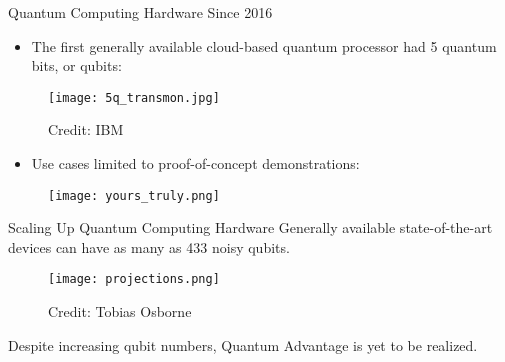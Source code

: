 \begin{frame}{Quantum Computing Hardware Since 2016}
  \begin{itemize}
    \setlength\itemsep{0.1em}
    \item The first generally available cloud-based quantum processor had {\color{red}5 quantum bits, or qubits}:
  \end{itemize}

  \begin{figure}
    \centering
    \texttt{[image: 5q\_transmon.jpg]}
    \vspace*{-3mm}
    \caption*{Credit: IBM}
  \end{figure}

  \begin{itemize}
    \setlength\itemsep{0.1em}
     \item Use cases limited to proof-of-concept demonstrations:
  \end{itemize}

  \begin{figure}
    \centering
    \texttt{[image: yours\_truly.png]}
  \end{figure}
\end{frame}

\begin{frame}{Scaling Up Quantum Computing Hardware}
  Generally available state-of-the-art devices can have as many as {\color{red}433} noisy qubits.

  \begin{figure}
    \centering
    \texttt{[image: projections.png]}
    \caption*{Credit: Tobias Osborne}
  \end{figure}
  Despite increasing qubit numbers, {\color{red}Quantum Advantage} is yet to be realized.
\end{frame}
